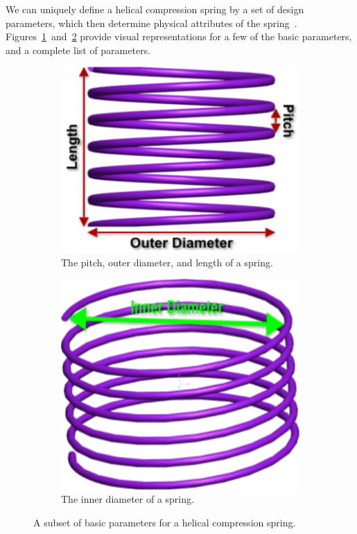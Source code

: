 \documentclass[10pt]{article}
\begin{document}
We can uniquely define a helical compression spring by a set of design parameters, which then determine physical attributes of the spring~\cite{Massad2015}. Figures~\ref{fig:Description1}~and~\ref{fig:Description2} provide visual representations for a few of the basic parameters, and a complete list of parameters. 		 
		\begin{figure}[h]
			\begin{subfigure}{.5\textwidth}
				\centering
				\includegraphics[scale=.17]{Spring_Description.png}
				\caption{The pitch, outer diameter, and length of a spring.}
				\label{fig:Description1}
			\end{subfigure}%
			\begin{subfigure}{.5\textwidth}
				  \centering
		 		\includegraphics[scale=.155]{Spring_Description2.png}
				\caption{The inner diameter of a spring.}
				  \label{fig:Description2}
		  		
			\end{subfigure}
			 \label{fig:Descriptions}
		  \caption{A subset of basic parameters for a helical compression spring.}
		\end{figure}
		
\end{document}
